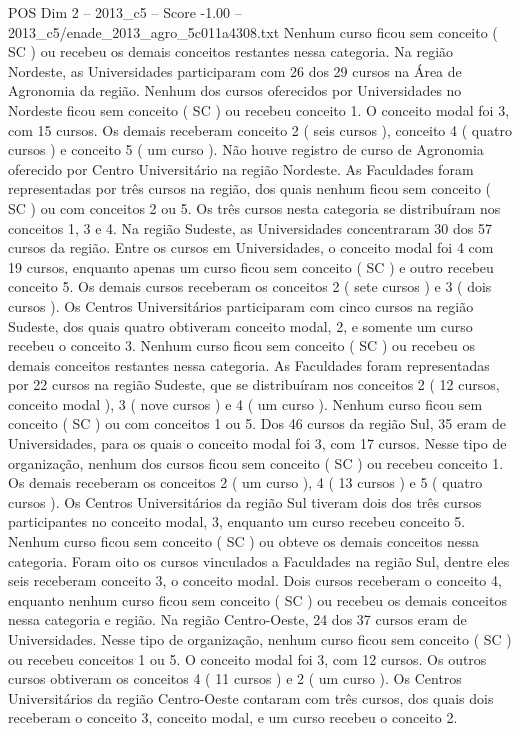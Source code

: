 \begin{textsample}{POS Dim 2 – 2013\_c5 – Score -1.00 – 2013\_c5/enade\_2013\_agro\_5c011a4308.txt}
Nenhum curso ficou sem conceito ( SC ) ou recebeu os demais conceitos restantes nessa categoria.
Na região Nordeste, as Universidades participaram com 26 dos 29 cursos na Área de Agronomia da região.
Nenhum dos cursos oferecidos por Universidades no Nordeste ficou sem conceito ( SC ) ou recebeu conceito 1.
O conceito modal foi 3, com 15 cursos.
Os demais receberam conceito 2 ( seis cursos ), conceito 4 ( quatro cursos ) e conceito 5 ( um curso ).
Não houve registro de curso de Agronomia oferecido por Centro Universitário na região Nordeste.
As Faculdades foram representadas por três cursos na região, dos quais nenhum ficou sem conceito ( SC ) ou com conceitos 2 ou 5.
Os três cursos nesta categoria se distribuíram nos conceitos 1, 3 e 4.
Na região Sudeste, as Universidades concentraram 30 dos 57 cursos da região.
Entre os cursos em Universidades, o conceito modal foi 4 com 19 cursos, enquanto apenas um curso ficou sem conceito ( SC ) e outro recebeu conceito 5.
Os demais cursos receberam os conceitos 2 ( sete cursos ) e 3 ( dois cursos ).
Os Centros Universitários participaram com cinco cursos na região Sudeste, dos quais quatro obtiveram conceito modal, 2, e somente um curso recebeu o conceito 3.
Nenhum curso ficou sem conceito ( SC ) ou recebeu os demais conceitos restantes nessa categoria.
As Faculdades foram representadas por 22 cursos na região Sudeste, que se distribuíram nos conceitos 2 ( 12 cursos, conceito modal ), 3 ( nove cursos ) e 4 ( um curso ).
Nenhum curso ficou sem conceito ( SC ) ou com conceitos 1 ou 5.
Dos 46 cursos da região Sul, 35 eram de Universidades, para os quais o conceito modal foi 3, com 17 cursos.
Nesse tipo de organização, nenhum dos cursos ficou sem conceito ( SC ) ou recebeu conceito 1.
Os demais receberam os conceitos 2 ( um curso ), 4 ( 13 cursos ) e 5 ( quatro cursos ).
Os Centros Universitários da região Sul tiveram dois dos três cursos participantes no conceito modal, 3, enquanto um curso recebeu conceito 5.
Nenhum curso ficou sem conceito ( SC ) ou obteve os demais conceitos nessa categoria.
Foram oito os cursos vinculados a Faculdades na região Sul, dentre eles seis receberam conceito 3, o conceito modal.
Dois cursos receberam o conceito 4, enquanto nenhum curso ficou sem conceito ( SC ) ou recebeu os demais conceitos nessa categoria e região.
Na região Centro-Oeste, 24 dos 37 cursos eram de Universidades.
Nesse tipo de organização, nenhum curso ficou sem conceito ( SC ) ou recebeu conceitos 1 ou 5.
O conceito modal foi 3, com 12 cursos.
Os outros cursos obtiveram os conceitos 4 ( 11 cursos ) e 2 ( um curso ).
Os Centros Universitários da região Centro-Oeste contaram com três cursos, dos quais dois receberam o conceito 3, conceito modal, e um curso recebeu o conceito 2.

\end{textsample}

